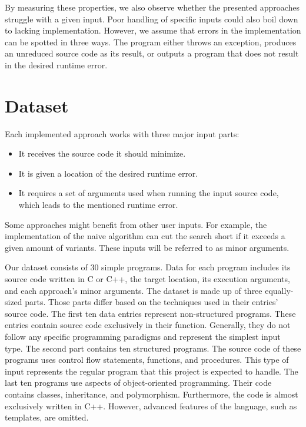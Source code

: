 By measuring these properties, we also observe whether the presented 
approaches struggle with a given input. 
Poor handling of specific inputs could also boil down to lacking 
implementation. 
However, we assume that errors in the implementation can be spotted in three 
ways. 
The program either throws an exception, produces an unreduced source code as 
its result, or outputs a program that does not result in the desired runtime 
error.

\section{Dataset}

Each implemented approach works with three major input parts:
\begin{itemize}
  \item It receives the source code it should minimize.
  \item It is given a location of the desired runtime error.
  \item It requires a set of arguments used when running the input source 
  code, which leads to the mentioned runtime error.
\end{itemize}
Some approaches might benefit from other user inputs. 
For example, the implementation of the naive algorithm can cut the search 
short if it exceeds a given amount of variants. 
These inputs will be referred to as minor arguments.

Our dataset consists of 30 simple programs. 
Data for each program includes its source code written in C or C++, 
the target location, its execution arguments, and each approach's minor 
arguments. 
The dataset is made up of three equally-sized parts. 
Those parts differ based on the techniques used in their entries' source code. 
The first ten data entries represent non-structured programs. 
These entries contain source code exclusively in their  function. 
Generally, they do not follow any specific programming paradigms and 
represent the simplest input type. 
The second part contains ten structured programs. 
The source code of these programs uses control flow statements, functions, 
and procedures. 
This type of input represents the regular program that this project is 
expected to handle. 
The last ten programs use aspects of object-oriented programming. 
Their code contains classes, inheritance, and polymorphism. 
Furthermore, the code is almost exclusively written in C++. 
However, advanced features of the language, such as templates, are omitted.

